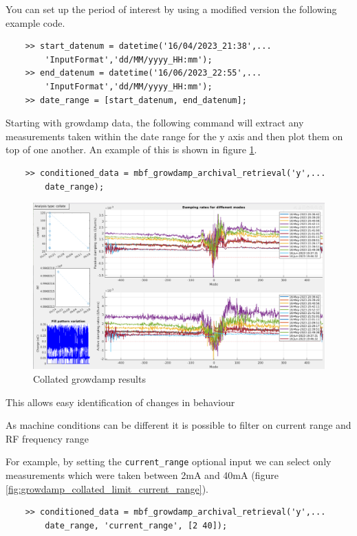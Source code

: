 \documentclass{report}
\begin{document}
You can set up the period of interest by using a modified version the following example code. 
\begin{verbatim}
    >> start_datenum = datetime('16/04/2023_21:38',...
        'InputFormat','dd/MM/yyyy_HH:mm'); 
    >> end_datenum = datetime('16/06/2023_22:55',...
        'InputFormat','dd/MM/yyyy_HH:mm'); 
    >> date_range = [start_datenum, end_datenum]; 
\end{verbatim}
Starting with growdamp data, the following command will extract any measurements taken within the date range for the y axis and then plot them on top of one another. An example of this is shown in figure \ref{fig:growdamp_collate}.
\begin{verbatim}
    >> conditioned_data = mbf_growdamp_archival_retrieval('y',...
        date_range); 
\end{verbatim}
\begin{figure}[ht]
    \centering
    \includegraphics[width=1\linewidth]{growdamp_collate.png}
    \caption{Collated growdamp results}
    \label{fig:growdamp_collate}
\end{figure}

This allows easy identification of changes in behaviour 


As machine conditions can be different it is possible to filter on current range and RF frequency range 

For example, by setting the \verb+current_range+ optional input we can select only measurements which were taken between 2mA and 40mA (figure \ref{fig:growdamp_collated_limit_current_range}).

\begin{verbatim}
    >> conditioned_data = mbf_growdamp_archival_retrieval('y',...
        date_range, 'current_range', [2 40]); 
\end{verbatim}
\end{document}
